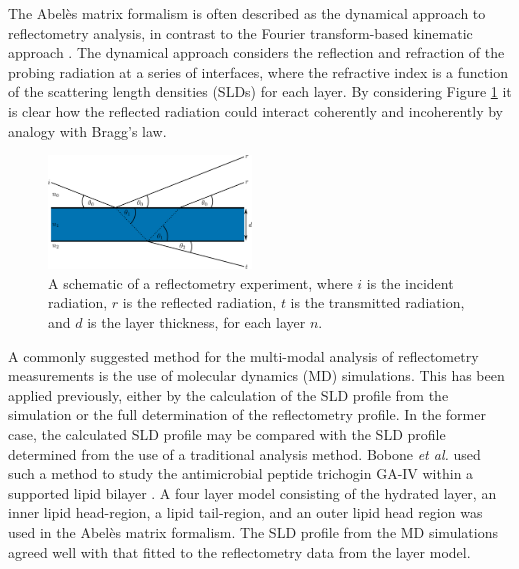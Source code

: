 \documentclass[amsmath,amssymb,twocolumn,superscriptaddress,aps,prl]{revtex4-1}
\begin{document}
The Abel\`{e}s matrix formalism is often described as the dynamical approach to reflectometry analysis, in contrast to the Fourier transform-based kinematic approach \cite{Crowley1991,Lu1996}.
The dynamical approach considers the reflection and refraction of the probing radiation at a series of interfaces, where the refractive index is a function of the scattering length densities (SLDs) for each layer.
By considering Figure \ref{fig:dyn} it is clear how the reflected radiation could interact coherently and incoherently by analogy with Bragg's law.
%
\begin{figure}[h]
\centering
  \includegraphics[width=0.48\textwidth]{figures/reflrefr}
  \caption{A schematic of a reflectometry experiment, where $i$ is the incident radiation, $r$ is the reflected radiation, $t$ is the transmitted radiation, and $d$ is the layer thickness, for each layer $n$.}
  \label{fig:dyn}
\end{figure}
%

A commonly suggested method for the multi-modal analysis of reflectometry measurements is the use of molecular dynamics (MD) simulations.
This has been applied previously, either by the calculation of the SLD profile from the simulation or the full determination of the reflectometry profile.
In the former case, the calculated SLD profile may be compared with the SLD profile determined from the use of a traditional analysis method.
Bobone \emph{et al.} used such a method to study the antimicrobial peptide trichogin GA-IV within a supported lipid bilayer \cite{Bobone2013}.
A four layer model consisting of the hydrated  layer, an inner lipid head-region, a lipid tail-region, and an outer lipid head region was used in the Abel\`{e}s matrix formalism.
The SLD profile from the MD simulations agreed well with that fitted to the reflectometry data from the layer model.
\end{document}
